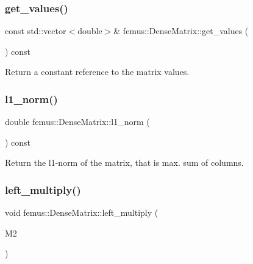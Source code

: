 \subsubsection{\texorpdfstring{get\+\_\+values()}{get\_values()}\hspace{0.1cm}{\footnotesize\ttfamily [2/2]}}
{\footnotesize\ttfamily const std\+::vector$<$double$>$\& femus\+::\+Dense\+Matrix\+::get\+\_\+values (\begin{DoxyParamCaption}{ }\end{DoxyParamCaption}) const\hspace{0.3cm}{\ttfamily [inline]}}



Return a constant reference to the matrix values. 

\mbox{\label{classfemus_1_1_dense_matrix_a7ef19514a04f38ba1baf8d33b981651d}} 
\subsubsection{\texorpdfstring{l1\+\_\+norm()}{l1\_norm()}}
{\footnotesize\ttfamily double femus\+::\+Dense\+Matrix\+::l1\+\_\+norm (\begin{DoxyParamCaption}{ }\end{DoxyParamCaption}) const\hspace{0.3cm}{\ttfamily [inline]}}



Return the l1-\/norm of the matrix, that is max. sum of columns. 

\mbox{\label{classfemus_1_1_dense_matrix_a80917b8698400957bc821308be3dafe5}} 
\subsubsection{\texorpdfstring{left\+\_\+multiply()}{left\_multiply()}}
{\footnotesize\ttfamily void femus\+::\+Dense\+Matrix\+::left\+\_\+multiply (\begin{DoxyParamCaption}\item[{const \mbox{\hyperlink{classfemus_1_1_dense_matrix_base}{Dense\+Matrix\+Base}} \&}]{M2 }\end{DoxyParamCaption})\hspace{0.3cm}{\ttfamily [virtual]}}



